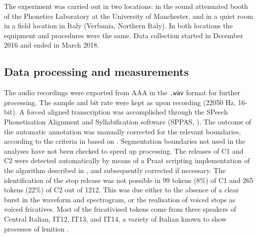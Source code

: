 \documentclass[charis]{glossa}
\begin{document}
The experiment was carried out in two locations: in the sound attenuated
booth of the Phonetics Laboratory at the University of Manchester, and
in a quiet room in a field location in Italy (Verbania, Northern Italy).
In both locations the equipment and procedures were the same. Data
collection started in December 2016 and ended in March 2018.

\hypertarget{data-processing-and-measurements}{%
\subsection{Data processing and
measurements}\label{data-processing-and-measurements}}


The audio recordings were exported from AAA in the \texttt{.wav} format
for further processing. The sample and bit rate were kept as upon
recording (22050 Hz, 16-bit). A forced aligned transcription was
accomplished through the SPeech Phonetisation Alignment and
Syllabification software (SPPAS, \citealt{bigi2015}). The outcome of the
automatic annotation was manually corrected for the relevant boundaries,
according to the criteria in  based on
\citet{machac2009}. Segmentation boundaries not used in the analyses
have not been checked to speed up processing. The releases of C1 and C2
were detected automatically by means of a Praat scripting implementation
of the algorithm described in \citet{ananthapadmanabha2014}, and
subsequently corrected if necessary. The identification of the stop
release was not possible in 99 tokens (8\%) of C1 and 265 tokens (22\%)
of C2 out of 1212. This was due either to the absence of a clear burst
in the waveform and spectrogram, or the realisation of voiced stops as
voiced fricatives. Most of the fricativised tokens come from three
speakers of Central Italian, IT12, IT13, and IT14, a variety of Italian
known to show processes of lenition \citep{hualde2011}.
\end{document}
